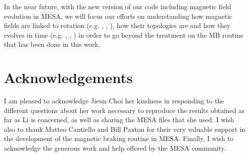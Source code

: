 \documentclass[fleqn,usenatbib]{mnras}
\begin{document}
In the near future, with the new version of our code including magnetic field evolution in MESA, we will focus our efforts on understanding how magnetic fields are linked to rotation (e.g. \citep{Maeder2005}, \citep{Morin2012}, \citep{Gondoin2018}), how their topologies are and how they evolves in time (e.g. \citep{Keppens1995}, \citep{Maeder2003a}, \citep{Vidotto2014}) in order to go beyond the treatment on the MB routine that has been done in this work.\par


\section*{Acknowledgements}
I am pleased to acknowledge Jieun Choi her kindness in responding to the different questions about her work necessary to reproduce the results obtained as far as Li is concerned, as well as sharing the MESA files that she used. I wish also to thank Matteo Cantiello and Bill Paxton for their very valuable support in the development of the magnetic braking routine in MESA. Finally, I wish to acknowledge the generous work and help offered by the MESA community.












\bsp	%
\label{lastpage}
\end{document}
